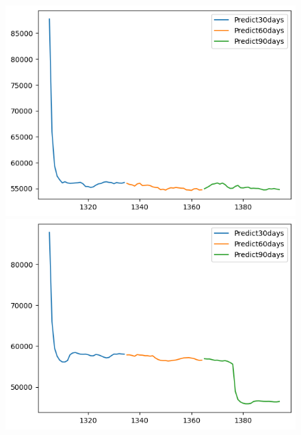 \begin{figure}[H]
\begin{minipage}{0.15\textwidth}
    \includegraphics[width=1\textwidth]{resources/chapter-5/newdata1/predicted/KF_VCB_8_2_30days.png}
    \end{minipage}
    \hfill
        \begin{minipage}{0.15\textwidth}
    \centering
    \includegraphics[width=1\textwidth]{resources/chapter-5/newdata1/predicted/KF_VCB_9_1_30days.png}
    \end{minipage}
    \hfill
    \begin{minipage}{0.15\textwidth}
    \centering

\end{minipage}
\end{figure}
